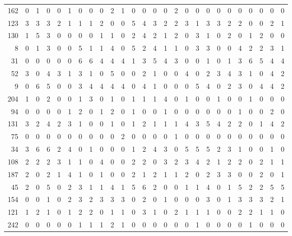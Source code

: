 \begin{longtable}{@{\extracolsep{\fill}}rccccccccccccccccccccccccc@{}}
162 & 0 & 1 & 0 & 0 & 1 & 0 & 0 & 0 & 2 & 1 & 0 & 0 & 0 & 0 & 2 & 0 & 0 & 0 & 0 & 0 & 0 & 0 & 0 & 0 & 0 \\
123 & 3 & 3 & 3 & 2 & 1 & 1 & 1 & 2 & 0 & 0 & 5 & 4 & 3 & 2 & 2 & 3 & 1 & 3 & 3 & 2 & 2 & 0 & 0 & 2 & 1 \\
130 & 1 & 5 & 3 & 0 & 0 & 0 & 0 & 1 & 1 & 0 & 2 & 4 & 2 & 1 & 2 & 0 & 3 & 1 & 0 & 2 & 0 & 1 & 2 & 0 & 0 \\
8 & 0 & 1 & 3 & 0 & 0 & 5 & 1 & 1 & 4 & 0 & 5 & 2 & 4 & 1 & 1 & 0 & 3 & 3 & 0 & 0 & 4 & 2 & 2 & 3 & 1 \\
31 & 0 & 0 & 0 & 0 & 0 & 6 & 6 & 4 & 4 & 4 & 1 & 3 & 5 & 4 & 3 & 0 & 0 & 1 & 0 & 1 & 3 & 6 & 5 & 4 & 4 \\
52 & 3 & 0 & 4 & 3 & 1 & 3 & 1 & 0 & 5 & 0 & 0 & 2 & 1 & 0 & 0 & 4 & 0 & 2 & 3 & 4 & 3 & 1 & 0 & 4 & 2 \\
9 & 0 & 6 & 5 & 0 & 0 & 3 & 4 & 4 & 4 & 4 & 0 & 4 & 1 & 0 & 0 & 0 & 5 & 4 & 0 & 2 & 3 & 0 & 4 & 4 & 2 \\
204 & 1 & 0 & 2 & 0 & 0 & 1 & 3 & 0 & 1 & 0 & 1 & 1 & 1 & 4 & 0 & 1 & 0 & 0 & 1 & 0 & 0 & 1 & 0 & 0 & 0 \\
94 & 0 & 0 & 0 & 0 & 1 & 2 & 0 & 1 & 2 & 0 & 1 & 0 & 0 & 1 & 0 & 0 & 0 & 0 & 0 & 0 & 1 & 0 & 0 & 2 & 0 \\
131 & 3 & 2 & 4 & 2 & 3 & 1 & 0 & 0 & 1 & 0 & 1 & 2 & 1 & 1 & 1 & 4 & 3 & 5 & 4 & 2 & 2 & 0 & 1 & 4 & 2 \\
75 & 0 & 0 & 0 & 0 & 0 & 0 & 0 & 0 & 0 & 2 & 0 & 0 & 0 & 0 & 1 & 0 & 0 & 0 & 0 & 0 & 0 & 0 & 0 & 0 & 0 \\
34 & 3 & 6 & 6 & 2 & 4 & 0 & 1 & 0 & 0 & 0 & 1 & 2 & 4 & 3 & 0 & 5 & 5 & 5 & 2 & 3 & 1 & 0 & 0 & 1 & 0 \\
108 & 2 & 2 & 2 & 3 & 1 & 1 & 0 & 4 & 0 & 0 & 2 & 2 & 0 & 3 & 2 & 3 & 4 & 2 & 1 & 2 & 2 & 0 & 2 & 1 & 1 \\
187 & 2 & 0 & 2 & 1 & 4 & 1 & 0 & 1 & 0 & 0 & 2 & 1 & 2 & 1 & 1 & 2 & 0 & 2 & 3 & 3 & 0 & 0 & 2 & 0 & 1 \\
45 & 2 & 0 & 5 & 0 & 2 & 3 & 1 & 1 & 4 & 1 & 5 & 6 & 2 & 0 & 0 & 1 & 1 & 4 & 0 & 1 & 5 & 2 & 2 & 5 & 5 \\
154 & 0 & 0 & 1 & 0 & 2 & 3 & 2 & 3 & 3 & 3 & 0 & 2 & 0 & 1 & 0 & 0 & 0 & 3 & 0 & 1 & 3 & 3 & 3 & 2 & 1 \\
121 & 1 & 2 & 1 & 0 & 1 & 2 & 2 & 0 & 1 & 1 & 0 & 3 & 1 & 0 & 2 & 1 & 1 & 1 & 0 & 0 & 2 & 2 & 1 & 1 & 0 \\
242 & 0 & 0 & 0 & 0 & 0 & 1 & 1 & 1 & 2 & 1 & 0 & 0 & 0 & 0 & 0 & 0 & 1 & 0 & 0 & 0 & 0 & 1 & 0 & 0 & 0 \\

\end{longtable}
